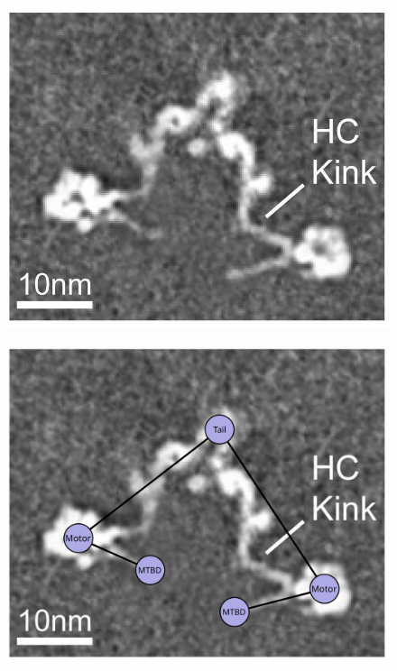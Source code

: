 \documentclass{article}
\begin{document}
\begin{figure}%
\centering
 \begin{minipage}{.3\textwidth}
   \centering
   \includegraphics[width=\linewidth]{figures/schematic-1-cryoem}
   \label{fig:modlengths}
 \end{minipage}%
 \begin{minipage}{.3\textwidth}
   \centering
   \includegraphics[width=\linewidth]{figures/schematic-1-superimposed}
   \label{fig:modlengths}
 \end{minipage}%

\end{figure}
\end{document}
